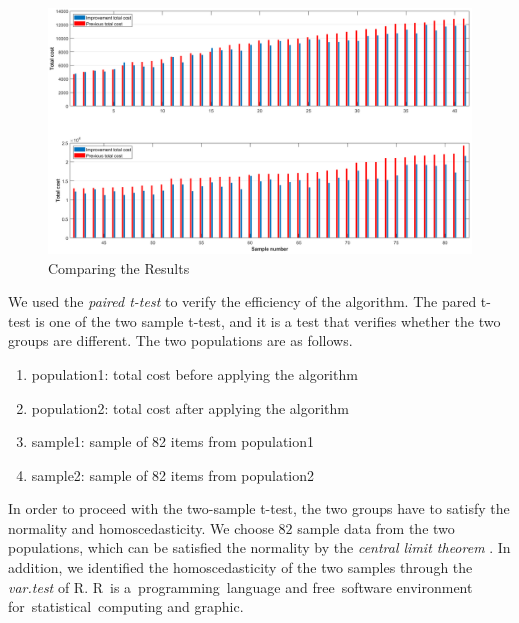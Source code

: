 \documentclass[a4paper]{amsart}
\numberwithin{equation}{section} %
\numberwithin{figure}{section} %
\numberwithin{table}{section}
\theoremstyle{plain}
\theoremstyle{definition}
\theoremstyle{plain}
\theoremstyle{plain}
\theoremstyle{plain}
\theoremstyle{plain}
\theoremstyle{plain}
\begin{document}
\begin{figure}[h!]
	\centering
	\includegraphics[width=\linewidth]{Graph_2.png}
	\caption{Comparing the Results}
	\label{fig:Comparing}       %
\end{figure}

We used the {\it paired t-test}\cite{Rice} to verify the efficiency of the algorithm. The pared t-test is one of the two sample t-test, and it is a test that verifies whether the two groups are different. The two populations are as follows.

\begin{enumerate}[$\bullet$]
	\item population1: total cost before applying the algorithm
	\item population2: total cost after applying the algorithm
	\item sample1: sample of 82 items from population1
	\item sample2: sample of 82 items from population2
\end{enumerate}

In order to proceed with the two-sample t-test, the two groups have to satisfy the normality and homoscedasticity. We choose $82$ sample data from the two populations, which can be satisfied the normality by the {\it central limit theorem} \cite{Durrett}.
In addition, we identified the homoscedasticity of the two samples through the {\it var.test} of R. 
R is a programming language and free software environment for statistical computing and graphic. %
\end{document}
